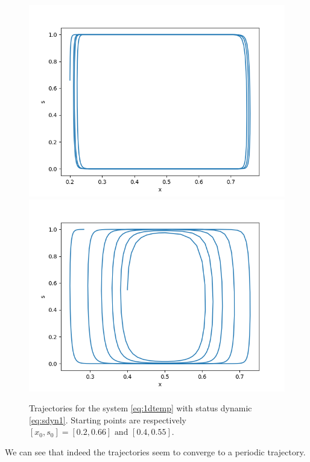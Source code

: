 \documentclass{article}
\begin{document}
\begin{figure}[H]
\centering
\includegraphics[scale=0.5]{traj1D1_02066.png}
\includegraphics[scale=0.5]{traj1D1_04055.png}
\caption{Trajectories for the system \ref{eq:1dtemp} with status dynamic \ref{eq:sdyn1}. Starting points are respectively $[x_0, s_0] = [0.2, 0.66] \text{   and   } [0.4, 0.55]$.}
\label{fig:traj1D1}
\end{figure}

We can see that indeed the trajectories seem to converge to a periodic trajectory.
\end{document}
